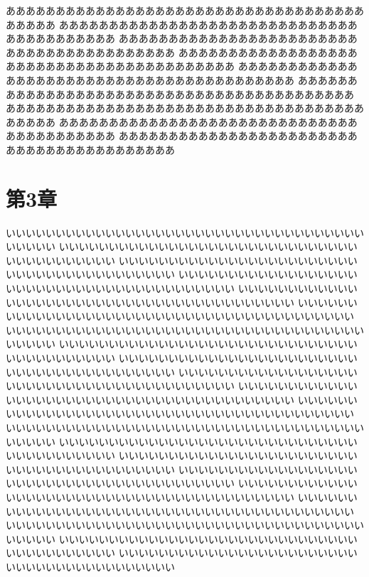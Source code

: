 \documentclass[a4paper,10pt,twocolumn]{jarticle}
\begin{document}
あああああああああああああああああああああああああああああああああああああああああ
あああああああああああああああああああああああああああああああああああああああああ
あああああああああああああああああああああああああああああああああああああああああ
あああああああああああああああああああああああああああああああああああああああああ
あああああああああああああああああああああああああああああああああああああああああ
あああああああああああああああああああああああああああああああああああああああああ
あああああああああああああああああああああああああああああああああああああああああ
あああああああああああああああああああああああああああああああああああああああああ
あああああああああああああああああああああああああああああああああああああああああ
\section{第3章} \label{third}
いいいいいいいいいいいいいいいいいいいいいいいいいいいいいいいいいいいいいいいいい
いいいいいいいいいいいいいいいいいいいいいいいいいいいいいいいいいいいいいいいいい
いいいいいいいいいいいいいいいいいいいいいいいいいいいいいいいいいいいいいいいいい
いいいいいいいいいいいいいいいいいいいいいいいいいいいいいいいいいいいいいいいいい
いいいいいいいいいいいいいいいいいいいいいいいいいいいいいいいいいいいいいいいいい
いいいいいいいいいいいいいいいいいいいいいいいいいいいいいいいいいいいいいいいいい
いいいいいいいいいいいいいいいいいいいいいいいいいいいいいいいいいいいいいいいいい
いいいいいいいいいいいいいいいいいいいいいいいいいいいいいいいいいいいいいいいいい
いいいいいいいいいいいいいいいいいいいいいいいいいいいいいいいいいいいいいいいいい
いいいいいいいいいいいいいいいいいいいいいいいいいいいいいいいいいいいいいいいいい
いいいいいいいいいいいいいいいいいいいいいいいいいいいいいいいいいいいいいいいいい
いいいいいいいいいいいいいいいいいいいいいいいいいいいいいいいいいいいいいいいいい
いいいいいいいいいいいいいいいいいいいいいいいいいいいいいいいいいいいいいいいいい
いいいいいいいいいいいいいいいいいいいいいいいいいいいいいいいいいいいいいいいいい
いいいいいいいいいいいいいいいいいいいいいいいいいいいいいいいいいいいいいいいいい
いいいいいいいいいいいいいいいいいいいいいいいいいいいいいいいいいいいいいいいいい
いいいいいいいいいいいいいいいいいいいいいいいいいいいいいいいいいいいいいいいいい
いいいいいいいいいいいいいいいいいいいいいいいいいいいいいいいいいいいいいいいいい
いいいいいいいいいいいいいいいいいいいいいいいいいいいいいいいいいいいいいいいいい
いいいいいいいいいいいいいいいいいいいいいいいいいいいいいいいいいいいいいいいいい
いいいいいいいいいいいいいいいいいいいいいいいいいいいいいいいいいいいいいいいいい
\end{document}
